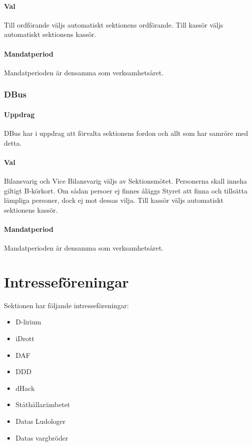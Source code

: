 \documentclass[a4paper, 10pt]{article}
\begin{document}
\paragraph{Val\\}
Till ordförande väljs automatiskt sektionens ordförande. Till kassör väljs automatiskt sektionens kassör.
\paragraph{Mandatperiod\\}
Mandatperioden är densamma som verksamhetsåret.
\subsubsection{DBus}
\paragraph{Uppdrag\\}
DBus har i uppdrag att förvalta sektionens fordon och allt som har samröre med detta.
\paragraph{Val\\}
Bilansvarig och Vice Bilansvarig väljs av Sektionsmötet. Personerna skall inneha giltigt B-körkort. Om sådan persoer ej finnes åläggs Styret att finna och tillsätta lämpliga personer, dock ej mot dessas vilja. Till kassör väljs automatiskt sektionens kassör.
\paragraph{Mandatperiod\\}
Mandatperioden är densamma som verksamhetsåret.
\newpage
\section{Intresseföreningar}
Sektionen har följande intresseföreningar:
\begin{itemize}
  \item D-lirium 
  \item iDrott 
  \item DAF 
  \item DDD
  \item dHack
  \item Ståthållarämbetet
  \item Datas Ludologer 
  \item Datas vargbröder
\end{itemize}
\end{document}
